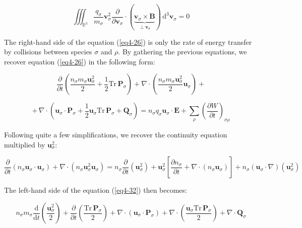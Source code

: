 \begin{equation}
    \iiint_{\mathbb{R}^3}\frac{q_\sigma}{m_\sigma}\mathbf{v}_\sigma^2\frac{\partial}{\partial\mathbf{v}_\sigma}\cdot(\underbrace{\mathbf{v}_\sigma\times\mathbf{B}}_{\perp\mathbf{v}_\sigma})\,\mathrm{d}^3\mathbf{v}_\sigma=0
\end{equation}

The right-hand side of the equation (\ref{eq4-26}) is only the rate of energy transfer by collisions between species $\sigma$ and $\rho$. By gathering the previous equations, we recover equation (\ref{eq4-26}) in the following form:

\begin{equation*}
    \frac{\partial}{\partial t}\left(\frac{n_\sigma m_\sigma\mathbf{u}_\sigma^2}{2}+\frac{1}{2}\mathrm{Tr}\,\mathbf{P}_\sigma\right)+\nabla\cdot\left(\frac{n_\sigma m_\sigma\mathbf{u}_\sigma^2}{2}\mathbf{u}_\sigma\right)+
\end{equation*}

\begin{equation}
    \label{eq4-32}
    +\,\nabla\cdot\left(\mathbf{u}_\sigma\cdot\mathbf{P}_\sigma
    +\frac{1}{2}\mathbf{u}_\sigma\mathrm{Tr}\,\mathbf{P}_\sigma+\mathbf{Q}_\sigma\right)=n_\sigma q_\sigma\mathbf{u}_\sigma\cdot\mathbf{E}+\sum_{\rho}\left(\frac{\partial W}{\partial t}\right)_{\sigma\rho}
\end{equation}

Following quite a few simplifications, we recover the continuity equation multiplied by $\mathbf{u}_\sigma^2$:

\begin{equation}
    \frac{\partial}{\partial t}\left(n_\sigma\mathbf{u}_\sigma\cdot\mathbf{u}_\sigma\right)+\nabla\cdot\left(n_\sigma\mathbf{u}_\sigma^2\mathbf{u}_\sigma\right)=n_\sigma\frac{\partial}{\partial t}\left(\mathbf{u}_\sigma^2\right)+\mathbf{u}_\sigma^2\left[\frac{\partial n_\sigma}{\partial t}+\nabla\cdot\left(n_\sigma\mathbf{u}_\sigma\right)\right]+n_\sigma(\mathbf{u}_\sigma\cdot\nabla)\left(\mathbf{u}_\sigma^2\right)
\end{equation}

The left-hand side of the equation (\ref{eq4-32}) then becomes:

\vspace*{-4pt}

\begin{equation}
    n_\sigma m_\sigma\frac{\mathrm{d}}{\mathrm{d}t}\left(\frac{\mathbf{u}_\sigma^2}{2}\right)+\frac{\partial}{\partial t}\left(\frac{\mathrm{Tr}\,\mathbf{P}_\sigma}{2}\right)+\nabla\cdot(\mathbf{u}_\sigma\cdot\mathbf{P}_\sigma)+\nabla\cdot\left(\frac{\mathbf{u}_\sigma\mathrm{Tr}\,\mathbf{P}_\sigma}{2}\right)+\nabla\cdot\mathbf{Q}_\sigma
\end{equation}

